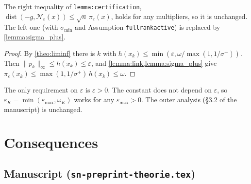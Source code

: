 \documentclass[11pt,a4paper]{article}
\numberwithin{equation}{section}
\theoremstyle{plain}
\newtheorem{corollary}[theorem]{Corollary}
\theoremstyle{definition}
\theoremstyle{remark}
\newcommand{\dist}{\operatorname{dist}}
\newcommand{\calN}{\mathcal{N}}
\newcommand{\codeus}{\textunderscore\allowbreak}
\newcommand{\code}[1]{{\let\_\codeus\texttt{#1}}}
\begin{document}
The right inequality of \code{lemma:\allowbreak certification},
$\dist(-g,\calN_\varepsilon(x))\le\sqrt n\,\pi_\varepsilon(x)$, holds for any multipliers, so it
is unchanged. The left one (with $\sigma_{\min}$ and Assumption \code{full\_rank\_active}) is
replaced by \cref{lemma:sigma_plus}.


\begin{proof}
By \cref{theo:liminf} there is $k$ with $h(x_k)\le\min(\varepsilon,\omega/\max(1,1/\sigma^+))$.
Then $\|p_k\|_\infty\le h(x_k)\le\varepsilon$, and \cref{lemma:link,lemma:sigma_plus} give
$\pi_\varepsilon(x_k)\le\max(1,1/\sigma^+)\,h(x_k)\le\omega$.
\end{proof}

The only requirement on $\varepsilon$ is $\varepsilon>0$. The constant does not depend on
$\varepsilon$, so $\varepsilon_K=\min(\varepsilon_{\max},\omega_K)$ works for any
$\varepsilon_{\max}>0$. The outer analysis (§3.2 of the manuscript) is unchanged.

\section{Consequences}\label{sec:consequences}

\subsection{Manuscript (\texorpdfstring{\code{sn-preprint-theorie.tex}}{sn-preprint-theorie.tex})}
\end{document}
